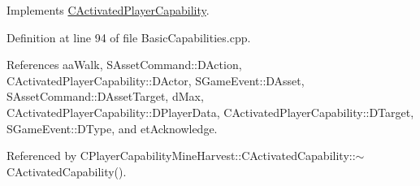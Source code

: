 Implements \hyperlink{classCActivatedPlayerCapability_a943b5999a57504399293250382c0ec6a}{C\+Activated\+Player\+Capability}.



Definition at line 94 of file Basic\+Capabilities.\+cpp.



References aa\+Walk, S\+Asset\+Command\+::\+D\+Action, C\+Activated\+Player\+Capability\+::\+D\+Actor, S\+Game\+Event\+::\+D\+Asset, S\+Asset\+Command\+::\+D\+Asset\+Target, d\+Max, C\+Activated\+Player\+Capability\+::\+D\+Player\+Data, C\+Activated\+Player\+Capability\+::\+D\+Target, S\+Game\+Event\+::\+D\+Type, and et\+Acknowledge.



Referenced by C\+Player\+Capability\+Mine\+Harvest\+::\+C\+Activated\+Capability\+::$\sim$\+C\+Activated\+Capability().



